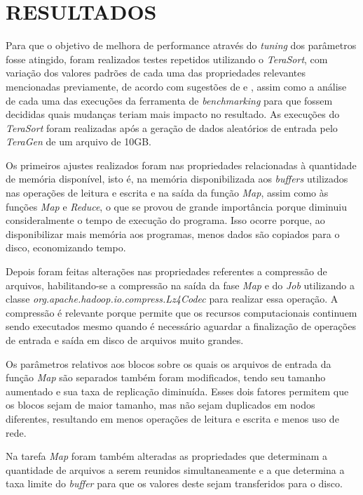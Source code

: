 \section{RESULTADOS} \label{sec:resultados}

Para que o objetivo de melhora de performance através do \textit{\gls{tuning}} dos parâmetros fosse atingido, foram realizados testes repetidos utilizando o \textit{TeraSort}, com variação dos valores padrões de cada uma das propriedades relevantes mencionadas previamente, de acordo com sugestões de \textcite{HadoopBook15} e \textcite{ProHadoop09}, assim como a análise de cada uma das execuções da ferramenta de \textit{\gls{benchmark}ing} para que fossem decididas quais mudanças teriam mais impacto no resultado. As execuções do \textit{TeraSort} foram realizadas após a geração de dados aleatórios de entrada pelo \textit{TeraGen} de um arquivo de 10GB.

Os primeiros ajustes realizados foram nas propriedades relacionadas à quantidade de memória disponível, isto é, na memória disponibilizada aos \textit{\gls{buffer}s} utilizados nas operações de leitura e escrita e na saída da função \textit{Map}, assim como às funções \textit{Map} e \textit{Reduce}, o que se provou de grande importância porque diminuiu consideralmente o tempo de execução do programa. Isso ocorre porque, ao disponibilizar mais memória aos programas, menos dados são copiados para o disco, economizando tempo.

Depois foram feitas alterações nas propriedades referentes a compressão de arquivos, habilitando-se a compressão na saída da fase \textit{Map} e do \textit{Job} utilizando a classe \textit{org.apache.hadoop.io.compress.Lz4Codec} para realizar essa operação. A compressão é relevante porque permite que os recursos computacionais continuem sendo executados mesmo quando é necessário aguardar a finalização de operações de entrada e saída em disco de arquivos muito grandes.

Os parâmetros relativos aos blocos sobre os quais os arquivos de entrada da função \textit{Map} são separados também foram modificados, tendo seu tamanho aumentado e sua taxa de replicação diminuída. Esses dois fatores permitem que os blocos sejam de maior tamanho, mas não sejam duplicados em nodos diferentes, resultando em menos operações de leitura e escrita e menos uso de rede.

Na tarefa \textit{Map} foram também alteradas as propriedades que determinam a quantidade de arquivos a serem reunidos simultaneamente e a que determina a taxa limite do \textit{\gls{buffer}} para que os valores deste sejam transferidos para o disco.

